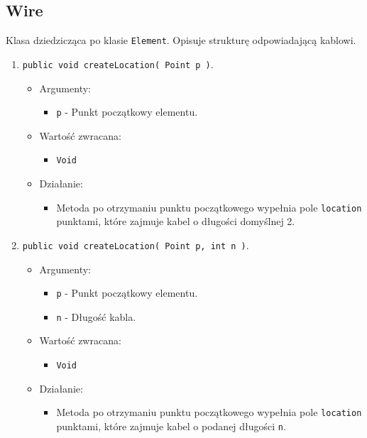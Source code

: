 \documentclass[a4paper,11pt, notitlepage ]{article}
\begin{document}
\subsection{Wire}
Klasa dziedzicząca po klasie \verb+Element+. Opisuje strukturę odpowiadającą kablowi.

\begin{enumerate}
\item \verb+public void createLocation( Point p )+.
\begin{itemize}
\item Argumenty:
\begin{itemize}
\item \verb+p+ - Punkt początkowy elementu.
\end{itemize}
\item Wartość zwracana:
\begin{itemize}
\item \verb+Void+
\end{itemize}
\item Działanie:
\begin{itemize}
\item Metoda po otrzymaniu punktu początkowego wypełnia pole \verb+location+ punktami, które zajmuje kabel o długości domyślnej 2.
\end{itemize}
\end{itemize}

\item \verb+public void createLocation( Point p, int n )+.
\begin{itemize}
\item Argumenty:
\begin{itemize}
\item \verb+p+ - Punkt początkowy elementu.
\item \verb+n+ - Długość kabla.
\end{itemize}
\item Wartość zwracana:
\begin{itemize}
\item \verb+Void+
\end{itemize}
\item Działanie:
\begin{itemize}
\item Metoda po otrzymaniu punktu początkowego wypełnia pole \verb+location+ punktami, które zajmuje kabel o podanej długości \verb+n+.
\end{itemize}
\end{itemize}
\end{enumerate}
\end{document}
